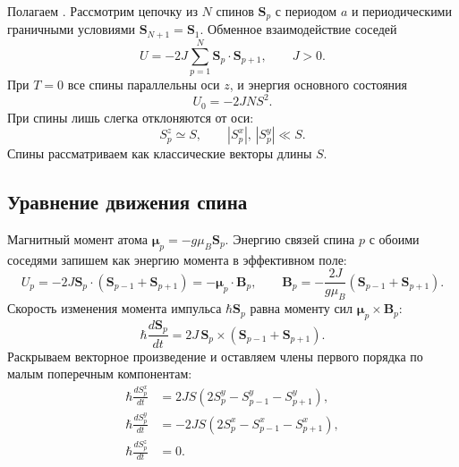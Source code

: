\documentclass[../final.tex]{subfiles}
\begin{document}

Полагаем . Рассмотрим цепочку из $N$ спинов
$\boldsymbol S_p$ с периодом $a$ и периодическими граничными
условиями $\boldsymbol S_{N+1}=\boldsymbol S_1$. Обменное
взаимодействие соседей
\[
 U=-2J\sum_{p=1}^N\boldsymbol S_p\cdot\boldsymbol S_{p+1},
 \qquad J>0.
\]
При $T=0$ все спины параллельны оси $z$, и энергия основного состояния
\[
 U_0=-2JNS^2.
\]
При  спины лишь слегка отклоняются
от оси:
\[
 S_p^z\simeq S,\qquad |S_p^x|,\,|S_p^y|\ll S.
\]
Спины рассматриваем как классические векторы длины $S$.

\subsection*{Уравнение движения спина}
Магнитный момент атома $\boldsymbol\mu_p=-g\mu_B\boldsymbol S_p$.
Энергию связей спина $p$ с обоими соседями запишем как энергию
момента в эффективном поле:
\[
 U_p=-2J\boldsymbol S_p\cdot
 \left(\boldsymbol S_{p-1}+\boldsymbol S_{p+1}\right)
 =-\boldsymbol\mu_p\cdot\boldsymbol B_p,\qquad
 \boldsymbol B_p=-\frac{2J}{g\mu_B}
 \left(\boldsymbol S_{p-1}+\boldsymbol S_{p+1}\right).
\]
Скорость изменения момента импульса $\hbar\boldsymbol S_p$ равна
моменту сил $\boldsymbol\mu_p\times\boldsymbol B_p$:
\[
 \hbar\frac{d\boldsymbol S_p}{dt}
 =2J\,\boldsymbol S_p\times
 \left(\boldsymbol S_{p-1}+\boldsymbol S_{p+1}\right).
\]
Раскрываем векторное произведение и оставляем члены первого порядка
по малым поперечным компонентам:
\begin{align*}
 \hbar\frac{dS_p^x}{dt}&=2JS\left(2S_p^y-S_{p-1}^y-S_{p+1}^y\right),\\
 \hbar\frac{dS_p^y}{dt}&=-2JS\left(2S_p^x-S_{p-1}^x-S_{p+1}^x\right),\\
 \hbar\frac{dS_p^z}{dt}&=0.
\end{align*}
\end{document}
